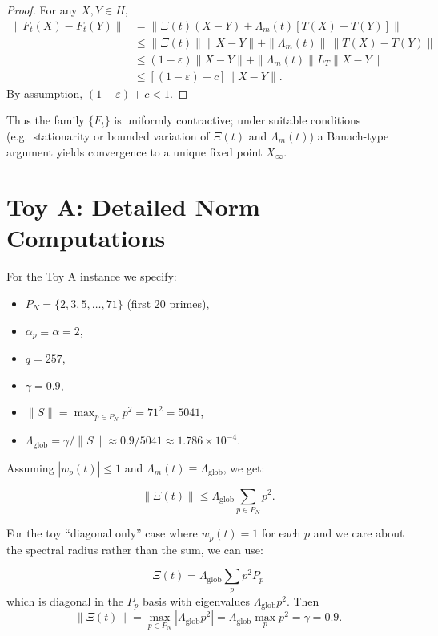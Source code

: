 \documentclass[11pt]{article}
\begin{document}
\begin{proof}
For any $X,Y\in H$,
\begin{align*}
\|F_t(X) - F_t(Y)\|
&= \|\Xi(t)(X-Y) + \Lambda_m(t)[T(X)-T(Y)]\| \\
&\le \|\Xi(t)\|\|X-Y\| + \|\Lambda_m(t)\|\,\|T(X)-T(Y)\| \\
&\le (1-\varepsilon)\|X-Y\| + \|\Lambda_m(t)\| L_T \|X-Y\| \\
&\le \left[(1-\varepsilon) + c\right] \|X-Y\|.
\end{align*}
By assumption, $(1-\varepsilon) + c < 1$.
\end{proof}

Thus the family $\{F_t\}$ is uniformly contractive; under suitable conditions
(e.g.\ stationarity or bounded variation of $\Xi(t)$ and $\Lambda_m(t)$) a
Banach-type argument yields convergence to a unique fixed point $X_\infty$.

\section{Toy A: Detailed Norm Computations}

For the Toy A instance we specify:

\begin{itemize}
    \item $P_N = \{2,3,5,\dots,71\}$ (first 20 primes),
    \item $\alpha_p \equiv \alpha = 2$,
    \item $q = 257$,
    \item $\gamma = 0.9$,
    \item $\|S\| = \max_{p\in P_N} p^{2} = 71^2 = 5041$,
    \item $\Lambda_{\mathrm{glob}} = \gamma / \|S\| \approx 0.9 / 5041 \approx 1.786\times 10^{-4}$.
\end{itemize}

Assuming $|w_p(t)|\le 1$ and $\Lambda_m(t) \equiv \Lambda_{\mathrm{glob}}$,
we get:

\[
\|\Xi(t)\|
\le \Lambda_{\mathrm{glob}} \sum_{p\in P_N} p^2.
\]

For the toy ``diagonal only'' case where $w_p(t) = 1$ for each $p$ and we
care about the spectral radius rather than the sum, we can use:

\[
\Xi(t) = \Lambda_{\mathrm{glob}} \sum_p p^2 P_p
\]
which is diagonal in the $P_p$ basis with eigenvalues $\Lambda_{\mathrm{glob}} p^2$.
Then
\[
\|\Xi(t)\| = \max_{p\in P_N} |\Lambda_{\mathrm{glob}} p^2|
= \Lambda_{\mathrm{glob}} \max_p p^2 = \gamma = 0.9.
\]
\end{document}
